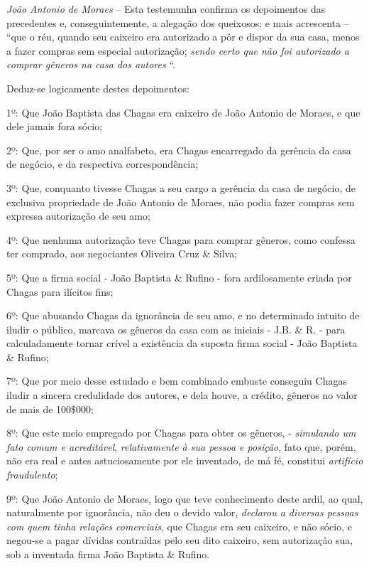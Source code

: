 {\emph{João Antonio de Moraes} -- Esta testemunha confirma os
depoimentos das precedentes e, conseguintemente, a alegação dos
queixosos; e mais acrescenta -- ``que o réu, quando seu caixeiro era
autorizado a pôr e dispor da sua casa, menos a fazer compras sem
especial autorização; \emph{sendo certo que não foi autorizado a comprar
gêneros na casa dos autores} ``.

\asterisc{}

Deduz-se logicamente destes depoimentos:

1º: Que João Baptista das Chagas era caixeiro de João Antonio de Moraes,
e que dele jamais fora sócio;

2º: Que, por ser o amo analfabeto, era Chagas encarregado da gerência da
casa de negócio, e da respectiva correspondência;

3º: Que, conquanto tivesse Chagas a seu cargo a gerência da casa de
negócio, de exclusiva propriedade de João Antonio de Moraes, não podia
fazer compras sem expressa autorização de seu amo;

4º: Que nenhuma autorização teve Chagas para comprar gêneros, como
confessa ter comprado, aos negociantes Oliveira Cruz \& Silva;

5º: Que a firma social - João Baptista \& Rufino - fora ardilosamente
criada por Chagas para ilícitos fins;

6º: Que abusando Chagas da ignorância de seu amo, e no determinado
intuito de iludir o público, marcava os gêneros da casa com as iniciais
- J.B. \& R. - para calculadamente tornar crível a existência da suposta
firma social - João Baptista \& Rufino;

7º: Que por meio desse estudado e bem combinado embuste conseguiu Chagas
iludir a sincera credulidade dos autores, e dela houve, a crédito,
gêneros no valor de mais de 100\$000;

8º: Que este meio empregado por Chagas para obter os gêneros, -
\emph{simulando um fato comum e acreditável}, \emph{relativamente à sua
pessoa e posição}, fato que, porém, não era real e antes astuciosamente
por ele inventado, de má fé, constitui \emph{artifício fraudulento};

9º: Que João Antonio de Moraes, logo que teve conhecimento deste ardil,
ao qual, naturalmente por ignorância, não deu o devido valor,
\emph{declarou a diversas pessoas com quem tinha relações comerciais},
que Chagas era seu caixeiro, e não sócio, e negou-se a pagar dívidas
contraídas pelo seu dito caixeiro, sem autorização sua, sob a inventada
firma João Baptista \& Rufino.

}
